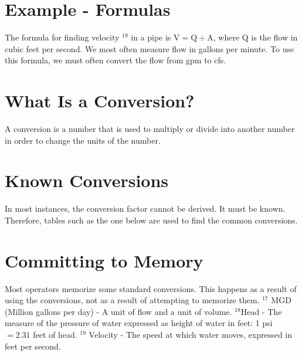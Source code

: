 \documentclass[10pt]{article}
\begin{document}
\section{Example - Formulas}
The formula for finding velocity ${ }^{19}$ in a pipe is $\mathrm{V}=\mathrm{Q} \div \mathrm{A}$, where $\mathrm{Q}$ is the flow in cubic feet per second. We most often measure flow in gallons per minute. To use this formula, we must often convert the flow from gpm to cfs.

\section{What Is a Conversion?}
A conversion is a number that is used to multiply or divide into another number in order to change the units of the number.

\section{Known Conversions}
In most instances, the conversion factor cannot be derived. It must be known. Therefore, tables such as the one below are used to find the common conversions.

\section{Committing to Memory}
Most operators memorize some standard conversions. This happens as a result of using the conversions, not as a result of attempting to memorize them. ${ }^{17}$ MGD (Million gallons per day) - A unit of flow and a unit of volume. ${ }^{18} \mathrm{Head}$ - The measure of the pressure of water expressed as height of water in feet: 1 psi $=2.31$ feet of head. ${ }^{19}$ Velocity - The speed at which water moves, expressed in feet per second.
\end{document}
